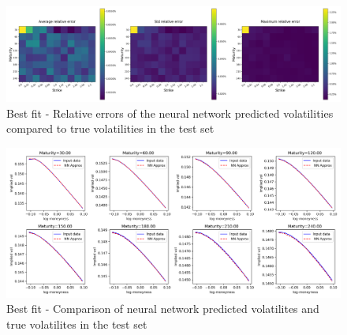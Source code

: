 \documentclass{article}
\begin{document}
\begin{figure}[!ht]
\centering
\includegraphics[width=\textwidth]{Low_error_Vola_HNG_NNErrors.png}
\caption{Best fit - Relative errors of the neural network predicted volatilities compared to true volatilities in the test set}
\label{fig:low_err_NN_rel_err}
\end{figure}
\begin{figure}[!ht]
\centering
\includegraphics[width=\textwidth]{Low_error_Vola_HNG_smile.png}
\caption{Best fit - Comparison of neural network predicted volatilites and true volatilites in the test set}
\label{fig:low_err_smile}
\end{figure}
\end{document}
